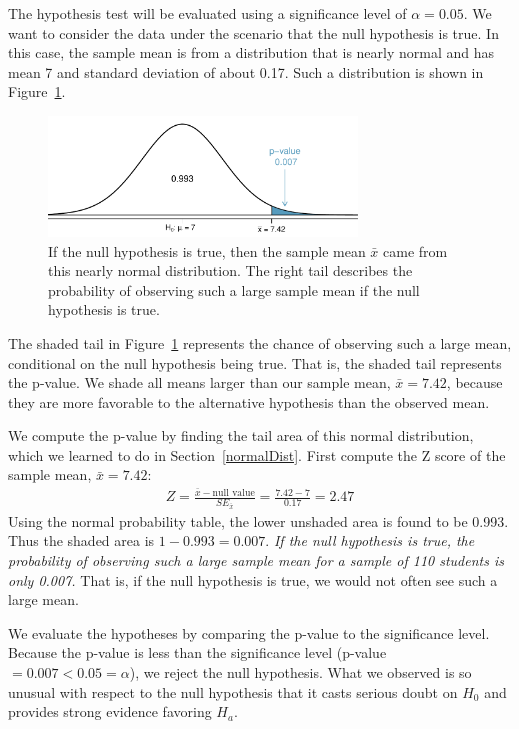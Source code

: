 The hypothesis test will be evaluated using a significance level of $\alpha = 0.05$. We want to consider the data under the scenario that the null hypothesis is true. In this case, the sample mean is from a distribution that is nearly normal and has mean 7 and standard deviation of about 0.17. Such a distribution is shown in Figure~\ref{pValueOneSidedSleepStudy}.

\begin{figure}[H]
   \centering
   \includegraphics[width=0.73\textwidth]{04/figures/pValueOneSidedSleepStudy/pValueOneSidedSleepStudy}
   \caption{If the null hypothesis is true, then the sample mean $\bar{x}$ came from this nearly normal distribution. The right tail describes the probability of observing such a large sample mean if the null hypothesis is true.}
   \label{pValueOneSidedSleepStudy}
\end{figure}

The shaded tail in Figure~\ref{pValueOneSidedSleepStudy} represents the chance of observing such a large mean, conditional on the null hypothesis being true. That is, the shaded tail represents the p-value. We shade all means larger than our sample mean, $\bar{x} = 7.42$, because they are more favorable to the alternative hypothesis than the observed mean.

We compute the p-value by finding the tail area of this normal distribution, which we learned to do in Section~\ref{normalDist}. First compute the Z score of the sample mean, $\bar{x} = 7.42$:
\begin{eqnarray*}
Z = \frac{\bar{x} - \text{null value}}{SE_{\bar{x}}} = \frac{7.42 - 7}{0.17} = 2.47
\end{eqnarray*}
Using the normal probability table, the lower unshaded area is found to be 0.993. Thus the shaded area is $1-0.993 = 0.007$. {\em If the null hypothesis is true, the probability of observing such a large sample mean for a sample of 110 students is only 0.007.} That is, if the null hypothesis is true, we would not often see such a large mean.

We evaluate the hypotheses by comparing the p-value to the significance level. Because the p-value is less than the significance level (p-value $=0.007 < 0.05=\alpha$), we reject the null hypothesis. What we observed is so unusual with respect to the null hypothesis that it casts serious doubt on $H_0$ and provides strong evidence favoring $H_a$.

